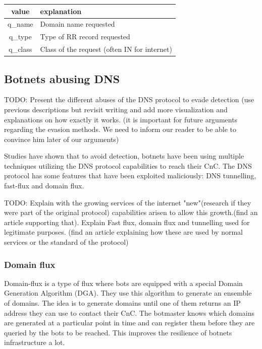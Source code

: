\begin{tabular}{c|l}
value & explanation\\
\hline
q\_name  & Domain name requested \\
q\_type  & Type of RR record requested \\
q\_class & Class of the request (often IN for internet) \\
\end{tabular}

\subsection{Botnets abusing DNS}
TODO: Present the different abuses of the DNS protocol to evade detection
(use previous descriptions but revisit writing and add more visualization and explanations on how exactly it works. (it is important for future arguments regarding the evasion methods. We need to inform our reader to be able to convince him later of our arguments)

Studies have shown that to avoid detection, botnets have been using multiple techniques utilizing the DNS protocol capabilities to reach their CnC. The DNS protocol has some features that have been exploited maliciously:  DNS tunnelling, fast-flux and domain flux.



TODO: Explain with the growing services of the internet "new"(research if they were part of the original protocol) capabilities arisen to allow this growth.(find an article supporting that). 
Explain Fast flux, domain flux and tunnelling used for legitimate purposes.
(find an article explaining how these are used by normal services or the standard of the protocol)



\subsubsection{Domain flux}
Domain-flux is a type of flux where bots are equipped with a special Domain Generation Algorithm (DGA).
They use this algorithm to generate an ensemble of domains. The idea is to generate domains until one of them returns an IP address they can use to contact their CnC. The botmaster knows which domains are generated at a particular point in time and can register them before they are queried by
the bots to be reached. This improves the resilience of botnets infrastructure a lot.


